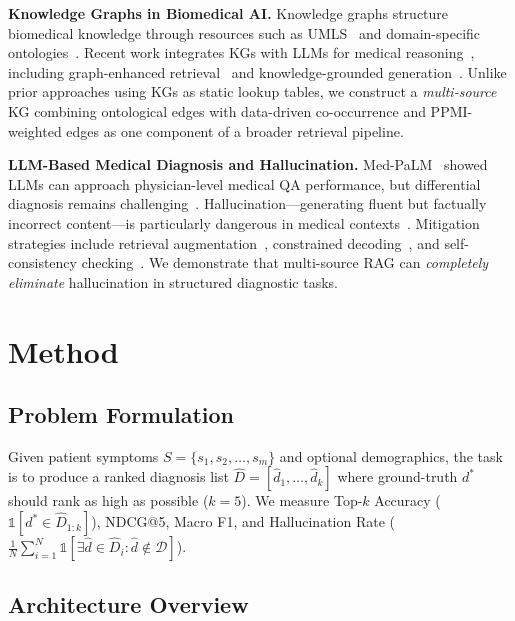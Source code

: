 \documentclass[preprint,12pt]{elsarticle}
\begin{document}
\textbf{Knowledge Graphs in Biomedical AI.} Knowledge graphs structure biomedical knowledge through resources such as UMLS~\cite{bodenreider2004unified} and domain-specific ontologies~\cite{santos2022knowledge,chandak2023building}. Recent work integrates KGs with LLMs for medical reasoning~\cite{pan2024unifying}, including graph-enhanced retrieval~\cite{he2024gretriever} and knowledge-grounded generation~\cite{yasunaga2022deep}. Unlike prior approaches using KGs as static lookup tables, we construct a \emph{multi-source} KG combining ontological edges with data-driven co-occurrence and PPMI-weighted edges as one component of a broader retrieval pipeline.

\textbf{LLM-Based Medical Diagnosis and Hallucination.} Med-PaLM~\cite{singhal2023large} showed LLMs can approach physician-level medical QA performance, but differential diagnosis remains challenging~\cite{mcduff2023towards}. Hallucination---generating fluent but factually incorrect content---is particularly dangerous in medical contexts~\cite{ji2023survey,umapathi2023med}. Mitigation strategies include retrieval augmentation~\cite{shuster2021retrieval}, constrained decoding~\cite{lu2022neurologic}, and self-consistency checking~\cite{manakul2023selfcheckgpt}. We demonstrate that multi-source RAG can \emph{completely eliminate} hallucination in structured diagnostic tasks.

\section{Method}
\label{sec:method}

\subsection{Problem Formulation}

Given patient symptoms $S = \{s_1, s_2, \ldots, s_m\}$ and optional demographics, the task is to produce a ranked diagnosis list $\hat{D} = [\hat{d}_1, \ldots, \hat{d}_k]$ where ground-truth $d^*$ should rank as high as possible ($k{=}5$). We measure Top-$k$ Accuracy ($\mathbb{1}[d^* \in \hat{D}_{1:k}]$), NDCG@5, Macro F1, and Hallucination Rate ($\frac{1}{N}\sum_{i=1}^{N} \mathbb{1}[\exists \hat{d} \in \hat{D}_i : \hat{d} \notin \mathcal{D}]$).

\subsection{Architecture Overview}
\end{document}
